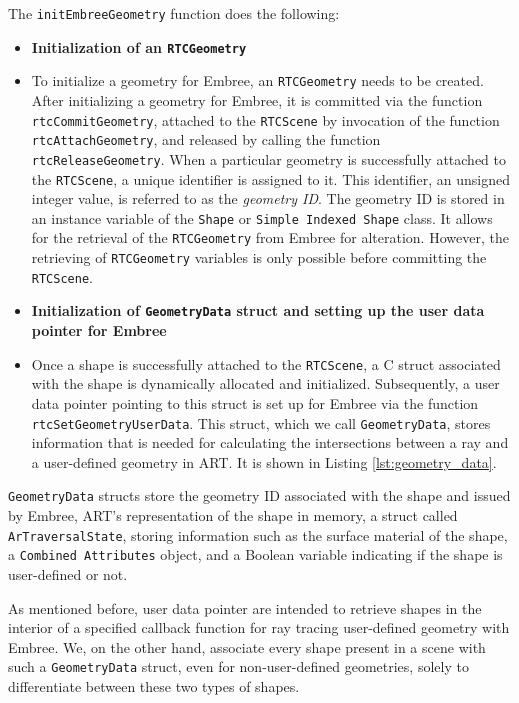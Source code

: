 The \texttt{initEmbreeGeometry} function does the following:

\begin{itemize}
	\setlength\itemsep{0.05em}
	
	\item \textbf{Initialization of an \texttt{RTCGeometry}}
	\item[] To initialize a geometry for Embree, an \texttt{RTCGeometry} needs to be created. After initializing a geometry for Embree, it is committed via the function \texttt{rtcCommitGeometry}, attached to the \texttt{RTCScene} by invocation of the function \texttt{rtcAttachGeometry}, and released by calling the function \texttt{rtcReleaseGeometry}. When a particular geometry is successfully attached to the \texttt{RTCScene}, a unique identifier is assigned to it. This identifier, an unsigned integer value, is referred to as the \emph{geometry ID}. The geometry ID is stored in an instance variable of the \texttt{Shape} or \texttt{Simple Indexed Shape} class. It allows for the retrieval of the \texttt{RTCGeometry} from Embree for alteration. However, the retrieving of \texttt{RTCGeometry} variables is only possible before committing the \texttt{RTCScene}. 
	\\
	
	\item \textbf{Initialization of \texttt{GeometryData} struct and setting up the user data pointer for Embree}
	\item[] Once a shape is successfully attached to the \texttt{RTCScene}, a C struct associated with the shape is dynamically allocated and initialized. Subsequently, a user data pointer pointing to this struct is set up for Embree via the function \texttt{rtcSetGeometryUserData}. This struct, which we call \texttt{GeometryData}, stores information that is needed for calculating the intersections between a ray and a user-defined geometry in ART. It is shown in Listing \ref{lst:geometry_data}.
	\\
	
\end{itemize}

\texttt{GeometryData} structs store the geometry ID associated with the shape and issued by Embree, ART's representation of the shape in memory, a struct called  \texttt{ArTraversalState}, storing information such as the surface material of the shape, a \texttt{Combined Attributes} object, and a Boolean variable indicating if the shape is user-defined or not.

As mentioned before, user data pointer are intended to retrieve shapes in the interior of a specified callback function for ray tracing user-defined geometry with Embree. We, on the other hand, associate every shape present in a scene with such a \texttt{GeometryData} struct, even for non-user-defined geometries, solely to differentiate between these two types of shapes.

